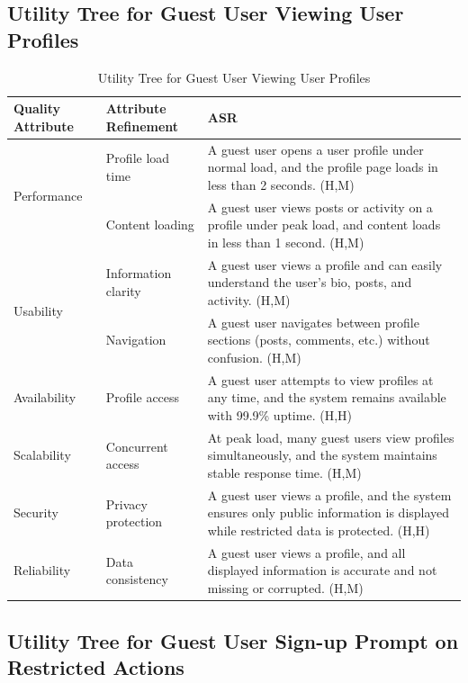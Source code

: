 \documentclass{article}
\begin{document}
\subsection{Utility Tree for Guest User Viewing User Profiles}

\begin{table}[H]
\centering
\caption{Utility Tree for Guest User Viewing User Profiles}
\begin{tabular}{|p{3cm}|p{4cm}|p{7cm}|}
\hline
\textbf{Quality Attribute} & \textbf{Attribute Refinement} & \textbf{ASR} \\
\hline

\multirow{2}{*}{Performance}
& Profile load time
& A guest user opens a user profile under normal load, and the profile page loads in less than 2 seconds. (H,M) \\
\cline{2-3}
& Content loading
& A guest user views posts or activity on a profile under peak load, and content loads in less than 1 second. (H,M) \\
\hline

\multirow{2}{*}{Usability}
& Information clarity
& A guest user views a profile and can easily understand the user's bio, posts, and activity. (H,M) \\
\cline{2-3}
& Navigation
& A guest user navigates between profile sections (posts, comments, etc.) without confusion. (H,M) \\
\hline

Availability
& Profile access
& A guest user attempts to view profiles at any time, and the system remains available with 99.9\% uptime. (H,H) \\
\hline

Scalability
& Concurrent access
& At peak load, many guest users view profiles simultaneously, and the system maintains stable response time. (H,M) \\
\hline

Security
& Privacy protection
& A guest user views a profile, and the system ensures only public information is displayed while restricted data is protected. (H,H) \\
\hline

Reliability
& Data consistency
& A guest user views a profile, and all displayed information is accurate and not missing or corrupted. (H,M) \\
\hline

\end{tabular}
\end{table}

\subsection{Utility Tree for Guest User Sign-up Prompt on Restricted Actions}
\end{document}

